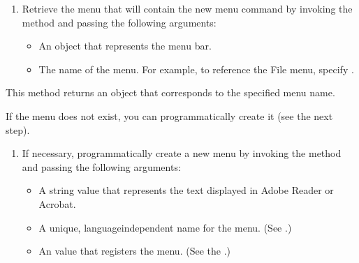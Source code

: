 \documentclass[letterpaper,12pt,english,openany,oneside]{sphinxmanual}
\begin{document}
\begin{sphinxVerbatim}[commandchars=\\\{\}]
   
\end{sphinxVerbatim}
\begin{enumerate}
%
\setcounter{enumi}{1}
\item {} 
Retrieve the menu that will contain the new menu command by invoking the  method and passing the following arguments:
\begin{itemize}
\item {} 
An  object that represents the menu bar.

\item {} 
The name of the menu. For example, to reference the File menu, specify .

\end{itemize}

\end{enumerate}

This method returns an  object that corresponds to the specified menu name.

\begin{sphinxVerbatim}[commandchars=\\\{\}]
    
\end{sphinxVerbatim}

If the menu does not exist, you can programmatically create it (see the next step).
\begin{enumerate}
%
\setcounter{enumi}{2}
\item {} 
If necessary, programmatically create a new menu by invoking the  method and passing the following arguments:
\begin{itemize}
\item {} 
A string value that represents the text displayed in Adobe Reader or Acrobat.

\item {} 
A unique, language\sphinxhyphen{}independent name for the menu. (See .)

\item {} 
An  value that registers the menu. (See the .)

\end{itemize}

\end{enumerate}
\end{document}
